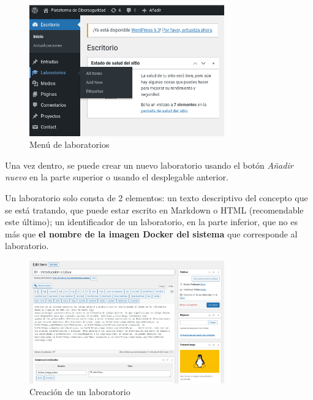 \begin{appendices}
\begin{figure}[!htbp]
                    \includegraphics[width=0.75\textwidth]{images/Capturas/localhost/laboratorios.png}
                    \caption{Menú de laboratorios}
                    \label{fig:laboratorios}
                \end{figure}

                Una vez dentro, se puede crear un nuevo laboratorio usando el botón \textit{Añadir nuevo} en la parte superior o usando el desplegable anterior.

                Un laboratorio solo consta de 2 elementos: un texto descriptivo del concepto que se está tratando, que puede estar escrito en Markdown o HTML (recomendable este último); un identificador de un laboratorio, en la parte inferior, que no es más que \textbf{el nombre de la imagen Docker del sistema} que corresponde al laboratorio.

                \begin{figure}[!htbp]
                    \centering

                    \includegraphics[width=0.75\textwidth]{images/Capturas/localhost/creacion.png}
                    \caption{Creación de un laboratorio}
                    \label{fig:anadir-laboratorio}
                \end{figure}


\end{appendices}
